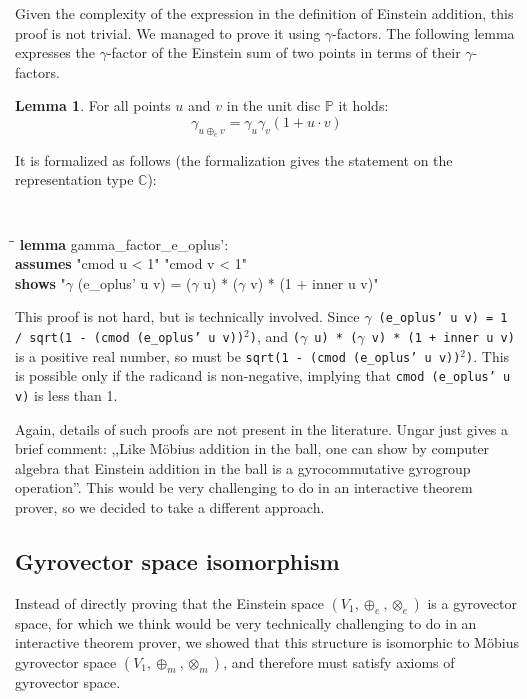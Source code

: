 \documentclass[a4paper]{article}
\newcommand{\tab}{\hspace{5mm}}
\theoremstyle{definition}
\newtheorem{lemma}[theorem]{Lemma}
\begin{document}
Given the complexity of the expression in the definition of Einstein
addition, this proof is not trivial. We managed to prove it using
$\gamma$-factors. The following lemma expresses the $\gamma$-factor of
the Einstein sum of two points in terms of their $\gamma$-factors.

\begin{lemma}\label{lemma:gammaeinstein}
  For all points $u$ and $v$ in the unit disc $\mathbb{P}$ it holds:
  $$\gamma_{u\oplus_e v} = \gamma_u\gamma_v(1+u\cdot v)$$
\end{lemma}

\noindent It is formalized as follows (the formalization gives the
statement on the representation type $\mathbb{C}$):

{\tt
\begin{small}
\begin{tabbing}
\tab\=\tab\=\kill
{\bf lemma} gamma\_factor\_e\_oplus':\\
\>  {\bf assumes} "cmod u < 1" "cmod v < 1"\\
\>  {\bf shows} "$\gamma$ (e\_oplus' u v) = ($\gamma$ u) * ($\gamma$ v) * (1 + inner u v)"
\end{tabbing}
\end{small}
}

\noindent This proof is not hard, but is technically involved. Since
\texttt{$\gamma$ (e\_oplus' u v) = 1 / sqrt(1 - (cmod (e\_oplus' u
  v))$^2$)}, and \texttt{($\gamma$ u) * ($\gamma$ v) * (1 + inner u
  v)} is a positive real number, so must be \texttt{sqrt(1 - (cmod
  (e\_oplus' u v))$^2$)}. This is possible only if the radicand is
non-negative, implying that \texttt{cmod (e\_oplus' u v)} is less than
1.

Again, details of such proofs are not present in the literature. Ungar
just gives a brief comment: ,,Like M\"obius addition in the ball, one
can show by computer algebra that Einstein addition in the ball is a
gyrocommutative gyrogroup operation''. This would be very challenging
to do in an interactive theorem prover, so we decided to take a
different approach.



\subsection{Gyrovector space isomorphism}

Instead of directly proving that the Einstein space
$(V_1, \oplus_e, \otimes_{e})$ is a gyrovector space, for which we
think would be very technically challenging to do in an interactive
theorem prover, we showed that this structure is isomorphic to
M\"obius gyrovector space $(V_1, \oplus_m, \otimes_{m})$, and
therefore must satisfy axioms of gyrovector space.
\end{document}

